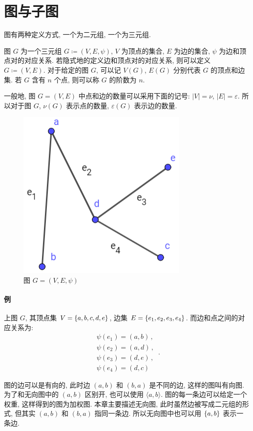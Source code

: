 \documentclass[UTF8]{ctexart}
\theoremstyle{mystyle}
\theoremstyle{myremark}
\theoremstyle{plain}
\DeclarePairedDelimiter\set{\{}{\}}
\begin{document}
\section{图与子图}

图有两种定义方式, 一个为二元组, 一个为三元组.

\begin{definition}[\text{图}]
    图 $ G $ 为一个三元组 $ G \coloneqq (V, E, \psi) $, $ V $ 为顶点的集合, $ E $ 为边的集合, $ \psi $ 为边和顶点对的对应关系. 若隐式地的定义边和顶点对的对应关系, 则可以定义 $ G \coloneqq (V, E) $. 对于给定的图 $ G $, 可以记 $ V(G) $, $ E(G) $ 分别代表 $ G $ 的顶点和边集. 若 $ G $ 含有 $ n $ 个点, 则可以称 $ G $ 的阶数为 $ n $.
\end{definition}

一般地, 图 $ G = (V, E) $ 中点和边的数量可以采用下面的记号: $ |V| = \nu $, $ |E| = \varepsilon $. 所以对于图 $ G $, $ \nu(G) $ 表示点的数量, $ \varepsilon(G) $ 表示边的数量.

\begin{figure}[H]
    \centering
    \includegraphics[width = 0.35\linewidth]{./images/graph_definition.png}
    \caption{图 $ G = (V, E, \psi) $}
\end{figure}

\paragraph{例}
上图 $ G $, 其顶点集 $ V = \set{a, b, c, d, e} $, 边集 $ E = \set{e_1, e_2, e_3, e_4} $. 而边和点之间的对应关系为:
\[ \begin{array}{c}
    \psi(e_1) = (a, b) \,,\\
    \psi(e_2) = (a, d) \,,\\
    \psi(e_3) = (d, e) \,,\\
    \psi(e_4) = (d, c)
\end{array} \,.\]

图的边可以是有向的, 此时边 $ (a, b) $ 和 $ (b, a) $ 是不同的边, 这样的图叫有向图. 为了和无向图中的 $ (a, b) $ 区别开, 也可以使用 $ \langle a, b \rangle $. 图的每一条边可以给定一个权重, 这样得到的图为加权图. 本章主要描述无向图, 此时虽然边被写成二元组的形式, 但其实 $ (a, b) $ 和 $ (b, a) $ 指同一条边. 所以无向图中也可以用 $ \set{a, b} $ 表示一条边.
\end{document}
